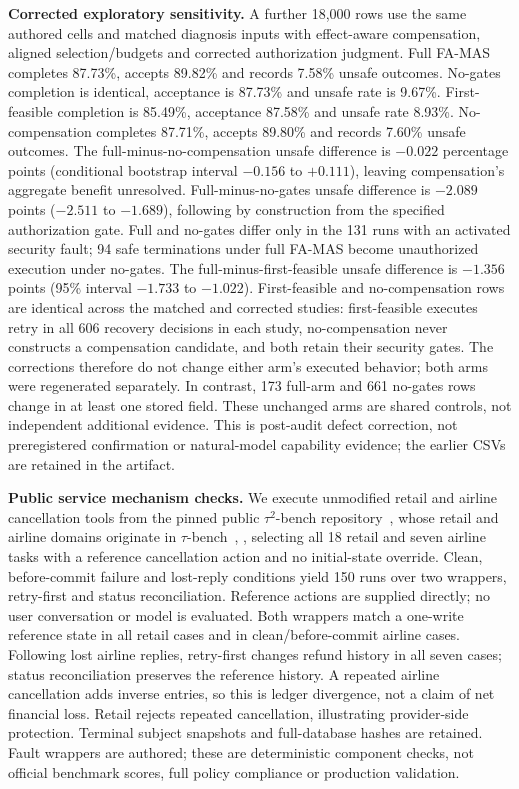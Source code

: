 \documentclass[10pt,journal,compsoc]{IEEEtran}
\newcommand{\famas}{FA-MAS}
\begin{document}
\textbf{Corrected exploratory sensitivity.} A further 18,000 rows use the same authored cells and matched diagnosis inputs with effect-aware compensation, aligned selection/budgets and corrected authorization judgment. Full \famas{} completes 87.73\%, accepts 89.82\% and records 7.58\% unsafe outcomes. No-gates completion is identical, acceptance is 87.73\% and unsafe rate is 9.67\%. First-feasible completion is 85.49\%, acceptance 87.58\% and unsafe rate 8.93\%. No-compensation completes 87.71\%, accepts 89.80\% and records 7.60\% unsafe outcomes. The full-minus-no-compensation unsafe difference is $-0.022$ percentage points (conditional bootstrap interval $-0.156$ to $+0.111$), leaving compensation's aggregate benefit unresolved. Full-minus-no-gates unsafe difference is $-2.089$ points ($-2.511$ to $-1.689$), following by construction from the specified authorization gate. Full and no-gates differ only in the 131 runs with an activated security fault; 94 safe terminations under full FA-MAS become unauthorized execution under no-gates. The full-minus-first-feasible unsafe difference is $-1.356$ points (95\% interval $-1.733$ to $-1.022$). First-feasible and no-compensation rows are identical across the matched and corrected studies: first-feasible executes retry in all 606 recovery decisions in each study, no-compensation never constructs a compensation candidate, and both retain their security gates. The corrections therefore do not change either arm's executed behavior; both arms were regenerated separately. In contrast, 173 full-arm and 661 no-gates rows change in at least one stored field. These unchanged arms are shared controls, not independent additional evidence. This is post-audit defect correction, not preregistered confirmation or natural-model capability evidence; the earlier CSVs are retained in the artifact.

\textbf{Public service mechanism checks.} We execute unmodified retail and airline cancellation tools from the pinned public $\tau^2$-bench repository~\cite{tau2repo}, whose retail and airline domains originate in $\tau$-bench~\cite{yao2025taubench}, \cite{barres2026tau2}, selecting all 18 retail and seven airline tasks with a reference cancellation action and no initial-state override. Clean, before-commit failure and lost-reply conditions yield 150 runs over two wrappers, retry-first and status reconciliation. Reference actions are supplied directly; no user conversation or model is evaluated. Both wrappers match a one-write reference state in all retail cases and in clean/before-commit airline cases. Following lost airline replies, retry-first changes refund history in all seven cases; status reconciliation preserves the reference history. A repeated airline cancellation adds inverse entries, so this is ledger divergence, not a claim of net financial loss. Retail rejects repeated cancellation, illustrating provider-side protection. Terminal subject snapshots and full-database hashes are retained. Fault wrappers are authored; these are deterministic component checks, not official benchmark scores, full policy compliance or production validation.
\end{document}
